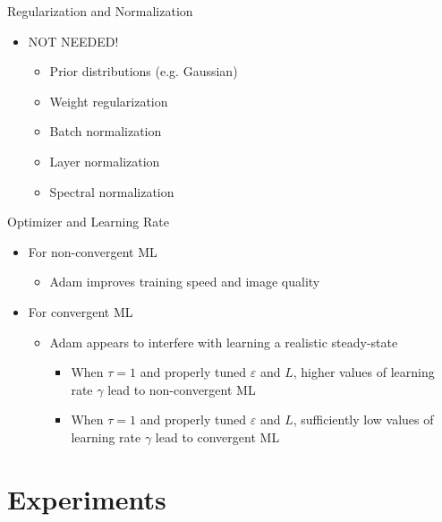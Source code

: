 \documentclass{beamer}
\begin{document}
\begin{frame}{Regularization and Normalization}
\begin{itemize}
\item NOT NEEDED!
\begin{itemize}
\item Prior distributions (e.g. Gaussian)
\item Weight regularization
\item Batch normalization
\item Layer normalization
\item Spectral normalization
\end{itemize}
\end{itemize}
\end{frame}

\begin{frame}{Optimizer and Learning Rate}
\begin{itemize}
\item For non-convergent ML
\begin{itemize}
\item Adam improves training speed and image quality
\end{itemize}
\item For convergent ML
\begin{itemize}
\item Adam appears to interfere with learning a realistic steady-state
\begin{itemize}
\item When $\tau=1$ and properly tuned $\varepsilon$ and $L$, higher values of learning rate $\gamma$ lead to non-convergent ML
\item When $\tau=1$ and properly tuned $\varepsilon$ and $L$, sufficiently low values of learning rate $\gamma$ lead to convergent ML
\end{itemize}
\end{itemize}
\end{itemize}
\end{frame}


\section{Experiments}
\end{document}
